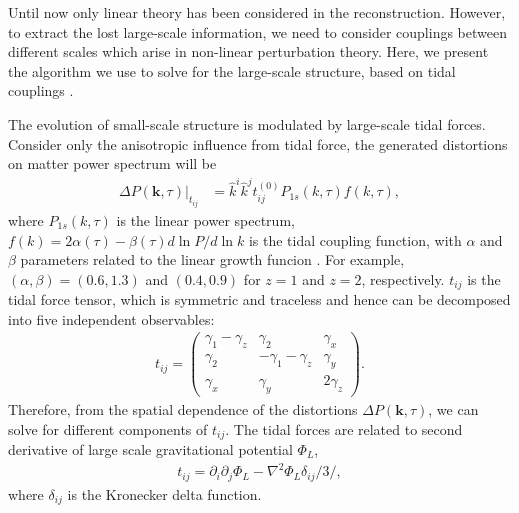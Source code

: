 Until now only linear theory has been considered in the reconstruction. However, to extract the lost large-scale information, we need to consider couplings between different scales which arise in non-linear perturbation theory. 
Here, we present the algorithm we use to solve for the large-scale structure, based on tidal couplings \cite{2015:zhu,2012:pen}.  

The evolution of small-scale structure is modulated by large-scale tidal forces. Consider only the anisotropic influence from tidal force, the generated distortions on matter power spectrum will be 
\begin{align}
\label{eq:powerdistort}
\Delta P(\bm{k},\tau)|_{t_{ij}} &=
\hat{k}^i\hat{k}^jt_{ij}^{(0)}P_{1s}(k,\tau)f(k,\tau),
\end{align}
where $P_{1s}(k,\tau)$ is the linear power spectrum, $f(k)=2\alpha(\tau)-\beta(\tau)d\ln P/d\ln k$ is the tidal coupling function, with $\alpha$ and $\beta$ parameters related to the linear growth funcion \cite{2015:zhu}. For example, $(\alpha,\beta)=(0.6,1.3)$ and $(0.4, 0.9)$ for $z=1$ and $z=2$, respectively. 
$t_{ij}$ is the tidal force tensor, which is symmetric and traceless and hence can be decomposed into five independent observables:  
\begin{eqnarray}
t_{ij}=\left( \begin{array}{ccc}
\gamma_{1}-\gamma_{z} & \gamma_{2} & \gamma_{x}\\
\gamma_{2} & -\gamma_{1}-\gamma_{z} & \gamma_{y}\\
\gamma_{x} & \gamma_{y} & 2\gamma_z
\end{array} \right).
\end{eqnarray}
Therefore, from the spatial dependence of the distortions $\Delta P(\bm{k},\tau)$, we can solve for different components of $t_{ij}$. The tidal forces are related to second derivative of large scale gravitational potential $\Phi_L$,  
\begin{eqnarray}
\label{eq:tij}
t_{ij}=\partial_i\partial_j\Phi_{L}-\nabla^2\Phi_L\delta_{ij}/3 /,
\end{eqnarray}
where $\delta_{ij}$ is the Kronecker delta function.

